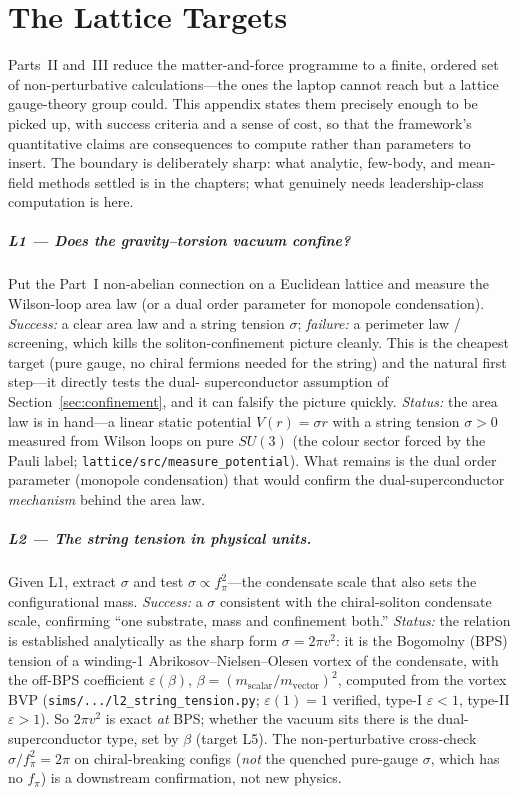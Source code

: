 \chapter{The Lattice Targets}
\label{app:lattice}

Parts~II and~III reduce the matter-and-force programme to a finite, ordered set of
non-perturbative calculations---the ones the laptop cannot reach but a lattice gauge-theory
group could. This appendix states them precisely enough to be picked up, with success criteria
and a sense of cost, so that the framework's quantitative claims are consequences to compute
rather than parameters to insert. The boundary is deliberately sharp: what analytic, few-body,
and mean-field methods settled is in the chapters; what genuinely needs leadership-class
computation is here.

\paragraph{L1 --- Does the gravity--torsion vacuum confine?}
Put the Part~I non-abelian connection on a Euclidean lattice and measure the Wilson-loop area
law (or a dual order parameter for monopole condensation). \emph{Success:} a clear area law and
a string tension $\sigma$; \emph{failure:} a perimeter law / screening, which kills the
soliton-confinement picture cleanly. This is the cheapest target (pure gauge, no chiral
fermions needed for the string) and the natural first step---it directly tests the dual-
superconductor assumption of Section~\ref{sec:confinement}, and it can falsify the picture
quickly. \emph{Status:} the area law is in hand---a linear static potential $V(r)=\sigma r$ with a
string tension $\sigma>0$ measured from Wilson loops on pure $SU(3)$ (the colour sector forced by
the Pauli label; \texttt{lattice/src/measure\_potential}). What remains is the dual order
parameter (monopole condensation) that would confirm the dual-superconductor \emph{mechanism}
behind the area law.

\paragraph{L2 --- The string tension in physical units.}
Given L1, extract $\sigma$ and test $\sigma \propto f_\pi^2$---the condensate scale that also
sets the configurational mass. \emph{Success:} a $\sigma$ consistent with the chiral-soliton
condensate scale, confirming ``one substrate, mass and confinement both.'' \emph{Status:} the
relation is established analytically as the sharp form $\sigma=2\pi v^2$: it is the Bogomolny
(BPS) tension of a winding-1 Abrikosov--Nielsen--Olesen vortex of the condensate, with the
off-BPS coefficient $\varepsilon(\beta)$, $\beta=(m_{\mathrm{scalar}}/m_{\mathrm{vector}})^2$,
computed from the vortex BVP (\texttt{sims/.../l2\_string\_tension.py}; $\varepsilon(1)=1$ verified,
type-I $\varepsilon<1$, type-II $\varepsilon>1$). So $2\pi v^2$ is exact \emph{at} BPS; whether the
vacuum sits there is the dual-superconductor type, set by $\beta$ (target L5). The non-perturbative
cross-check $\sigma/f_\pi^2=2\pi$ on chiral-breaking configs (\emph{not} the quenched pure-gauge
$\sigma$, which has no $f_\pi$) is a downstream confirmation, not new physics.

